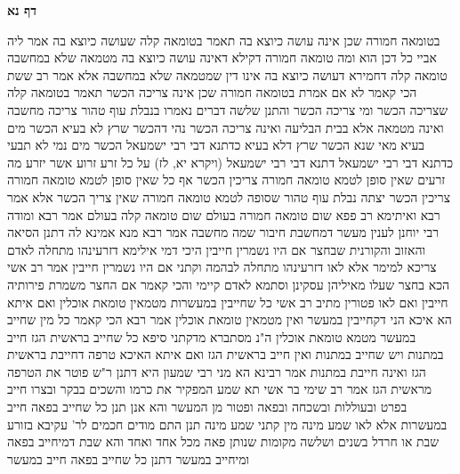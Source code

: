 \documentclass[12pt, openany]{book}
\newcommand{\sethebfont}{
\fontsize{10.5pt}{21.0pt} \selectfont
}
\newcommand{\twocol}[1]{
	{\sethebfont \begin{multicols}{2}
			#1
	\end{multicols}}	
}
\newcommand{\sectname}{}
\newcommand{\newsection}[1]{
	\addcontentsline{toc}{section}{#1}
	\renewcommand{\sectname}{#1}	
	\vspace{-\baselineskip}
	\begin{center}
		\textbf{%
\fontsize{16pt}{16pt}\selectfont
			#1}
	\end{center}
	\vspace{-\baselineskip}
	\nopagebreak
}
\begin{document}
\newsection{דף נא}
\twocol{בטומאה חמורה שכן אינה עושה כיוצא בה תאמר בטומאה קלה שעושה כיוצא בה 
אמר ליה אביי כל דכן הוא ומה טומאה חמורה דקילא דאינה עושה כיוצא בה מטמאה שלא במחשבה טומאה קלה דחמירא דעושה כיוצא בה אינו דין שמטמאה שלא במחשבה 
אלא אמר רב ששת הכי קאמר לא אם אמרת בטומאה חמורה שכן אינה צריכה הכשר תאמר בטומאה קלה שצריכה הכשר 
ומי צריכה הכשר והתנן שלשה דברים נאמרו בנבלת עוף טהור צריכה מחשבה ואינה מטמאה אלא בבית הבליעה ואינה צריכה הכשר 
נהי דהכשר שרץ לא בעיא הכשר מים בעיא 
מאי שנא הכשר שרץ דלא בעיא כדתנא דבי רבי ישמעאל הכשר מים נמי לא תבעי כדתנא דבי רבי ישמעאל 
דתנא דבי רבי ישמעאל (ויקרא יא, לז) על כל זרע זרוע אשר יזרע
מה זרעים שאין סופן לטמא טומאה חמורה צריכין הכשר אף כל שאין סופן לטמא טומאה חמורה צריכין הכשר יצתה נבלת עוף טהור שסופה לטמא טומאה חמורה שאין צריך הכשר 
אלא אמר רבא ואיתימא רב פפא שום טומאה חמורה בעולם שום טומאה קלה בעולם 
אמר רבא ומודה רבי יוחנן לענין מעשר דמחשבת חיבור שמה מחשבה אמר רבא מנא אמינא לה דתנן הסיאה והאזוב והקורנית שבחצר אם היו נשמרין חייבין 
היכי דמי אילימא דזרעינהו מתחלה לאדם צריכא למימר אלא לאו דזרעינהו מתחלה לבהמה וקתני אם היו נשמרין חייבין 
אמר רב אשי הכא בחצר שעלו מאיליהן עסקינן וסתמא לאדם קיימי והכי קאמר אם החצר משמרת פירותיה חייבין ואם לאו פטורין 
מתיב רב אשי כל שחייבין במעשרות מטמאין טומאת אוכלין ואם איתא הא איכא הני דקחייבין במעשר ואין מטמאין טומאת אוכלין 
אמר רבא הכי קאמר כל מין שחייב במעשר מטמא טומאת אוכלין 
ה"נ מסתברא מדקתני סיפא כל שחייב בראשית הגז חייב במתנות ויש שחייב במתנות ואין חייב בראשית הגז 
ואם איתא האיכא טרפה דחייבת בראשית הגז ואינה חייבת במתנות 
אמר רבינא הא מני רבי שמעון היא דתנן ר"ש פוטר את הטרפה מראשית הגז 
אמר רב שימי בר אשי תא שמע המפקיר את כרמו והשכים בבקר ובצרו חייב בפרט ובעוללות ובשכחה ובפאה ופטור מן המעשר 
והא אנן תנן כל שחייב בפאה חייב במעשרות אלא לאו שמע מינה מין קתני שמע מינה 
תנן התם מודים חכמים לר' עקיבא בזורע שבת או חרדל בשנים ושלשה מקומות שנותן פאה מכל אחד ואחד
והא שבת דמיחייב בפאה ומיחייב במעשר דתנן כל שחייב בפאה חייב במעשר 
}
\end{document}
